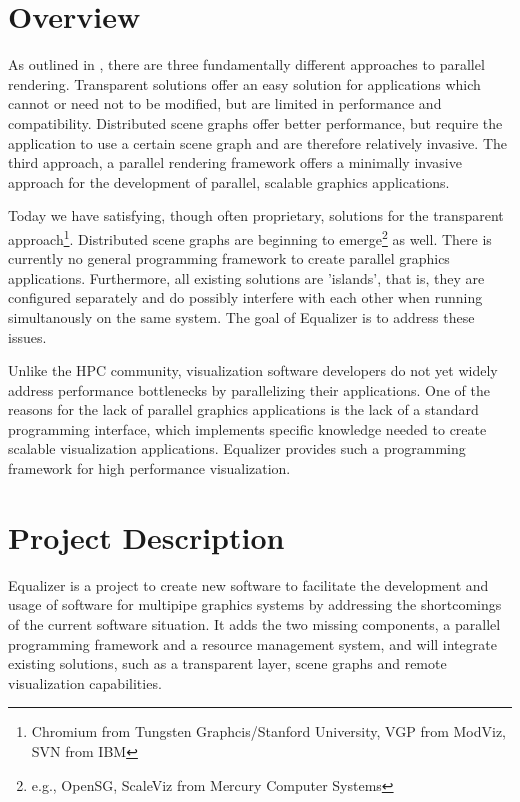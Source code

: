 \documentclass[10pt,a4paper]{scrartcl}
\begin{document}
\section{Overview}
As outlined in \cite{Analysis}, there are three fundamentally different
approaches to parallel rendering. Transparent solutions offer an easy
solution for applications which cannot or need not to be modified, but
are limited in performance and compatibility. Distributed scene graphs
offer better performance, but require the application to use a certain
scene graph and are therefore relatively invasive. The third approach, a
parallel rendering framework offers a minimally invasive approach for
the development of parallel, scalable graphics applications.

Today we have satisfying, though often proprietary, solutions for the
transparent approach\footnote{Chromium from Tungsten Graphcis/Stanford
  University, VGP from ModViz, SVN from IBM}. Distributed scene graphs
are beginning to emerge\footnote{e.g., OpenSG, ScaleViz from Mercury
  Computer Systems} as well. There is currently no general programming
framework to create parallel graphics applications. Furthermore, all
existing solutions are 'islands', that is, they are configured
separately and do possibly interfere with each other when running
simultanously on the same system. The goal of Equalizer is to address
these issues.

Unlike the HPC community, visualization software developers do not yet
widely address performance bottlenecks by parallelizing their
applications. One of the reasons for the lack of parallel graphics
applications is the lack of a standard programming interface, which
implements specific knowledge needed to create scalable visualization
applications. Equalizer provides such a programming framework for high
performance visualization.

\section{Project Description}

Equalizer is a project to create new software to facilitate the
development and usage of software for multipipe graphics systems by
addressing the shortcomings of the current software situation. It adds
the two missing components, a parallel programming framework and a
resource management system, and will integrate existing solutions, such
as a transparent layer, scene graphs and remote visualization
capabilities.
\end{document}
